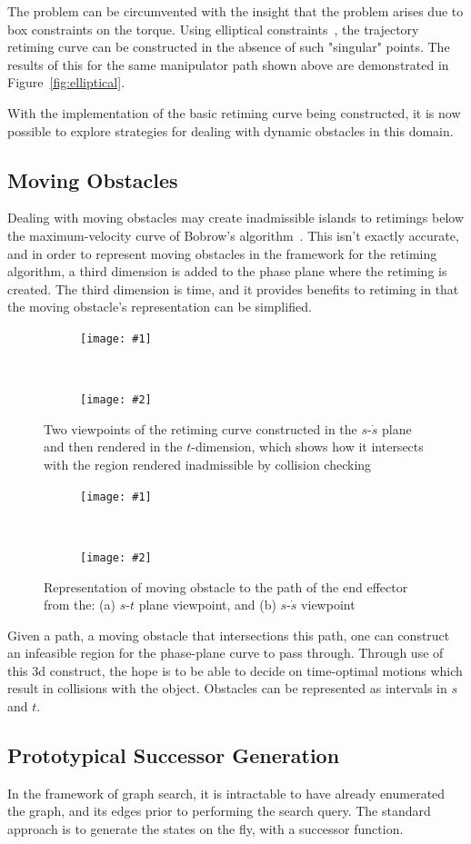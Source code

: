 \documentclass[letterpaper,10pt]{article} %
\newcommand{\ffigdouble}[4]{
\begin{figure}[h!]
\centering

\begin{subfigure}[l!]{0.48\linewidth}
\texttt{[image: \#1]}
\caption{}
\label{fig:#4L}
\end{subfigure}
~
\begin{subfigure}[r!]{0.48\linewidth}
\texttt{[image: \#2]}
\caption{}
\label{fig:#4R}
\end{subfigure}

\caption{#3}
\label{fig:#4}
\end{figure}
}
\begin{document}
The problem can be circumvented with the insight that the problem arises due to box constraints on the torque. Using elliptical constraints~\cite{shiller1992computation}, the trajectory retiming curve can be constructed in the absence of such "singular" points. The results of this for the same manipulator path shown above are demonstrated in Figure~\ref{fig:elliptical}.

With the implementation of the basic retiming curve being constructed, it is now possible to explore strategies for dealing with dynamic obstacles in this domain.

\subsection{Moving Obstacles}\label{subsec:obs}

Dealing with moving obstacles may create inadmissible islands to retimings below the maximum-velocity curve of Bobrow's algorithm~\cite{shin1985minimum}. This isn't exactly accurate, and in order to represent moving obstacles in the framework for the retiming algorithm, a third dimension is added to the phase plane where the retiming is created. The third dimension is time, and it provides benefits to retiming in that the moving obstacle's representation can be simplified.

\ffigdouble{pics/representation3d1}{pics/representation3d2}{Two viewpoints of the retiming curve constructed in the $s$-$\dot{s}$ plane and then rendered in the $t$-dimension, which shows how it intersects with the region rendered inadmissible by collision checking}{rep3da}

\ffigdouble{pics/representation3d3}{pics/representation3d4}{Representation of moving obstacle to the path of the end effector from the: (a) $s$-$t$ plane viewpoint, and (b) $s$-$\dot{s}$ viewpoint}{rep3db}

Given a path, a moving obstacle that intersections this path, one can construct an infeasible region for the phase-plane curve to pass through. Through use of this 3d construct, the hope is to be able to decide on time-optimal motions which result in collisions with the object. Obstacles can be represented as intervals in $s$ and $t$.


\subsection{Prototypical Successor Generation}\label{subsec:succ}

In the framework of graph search, it is intractable to have already enumerated the graph, and its edges prior to performing the search query. The standard approach is to generate the states on the fly, with a successor function.
\end{document}

